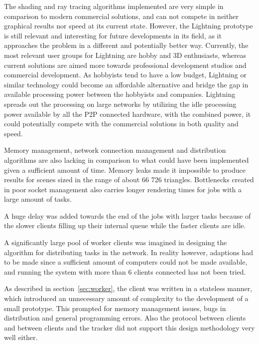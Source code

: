 The shading and ray tracing algorithms implemented are very simple in
comparison to modern commercial solutions, and can not compete 
in neither graphical results nor speed at its current state. However, the
Lightning prototype is still relevant and interesting for 
future developments in its field, as it approaches the problem in a different
and potentially better way. Currently, the most 
relevant user groups for Lightning are hobby and 3D enthusiasts, whereas
current solutions are aimed more towards professional 
development studios and commercial development. As hobbyists tend to have a
low budget, Lightning or similar technology could become 
an affordable alternative and bridge the gap in available processing power
between the hobbyists and companies. Lightning spreads 
out the processing on large networks by utilizing the idle processing power
available by all the P2P connected hardware, with the 
combined power, it could potentially compete with the commercial solutions
in both quality and speed.

Memory management, network connection management and distribution algorithms are
also lacking in comparison to what could have been implemented given a
sufficient amount of time. Memory leaks made it
impossible to produce results for scenes sized in the range of about 66 726
triangles. Bottlenecks created in poor socket management also carries longer
rendering times for jobs with a large amount of tasks.

A huge delay was added towards the end of the jobs with larger tasks because
of the slower clients filling up their internal queue while the faster clients are idle.

A significantly large pool of worker clients was imagined in designing the algorithm for
distributing tasks in the network. In reality however, adaptions had to be made
since a sufficient amount of computers could not be made available, and running
the system with more than 6 clients connected has not been tried.

As described in section~\ref{sec:worker}, the client was written in a stateless
manner, which introduced an unnecessary amount of complexity to the development
of a small prototype. This prompted for memory management issues, bugs in 
distribution and general programming errors. Also the protocol between clients
and between clients and the tracker did not support this design methodology very
well either.

